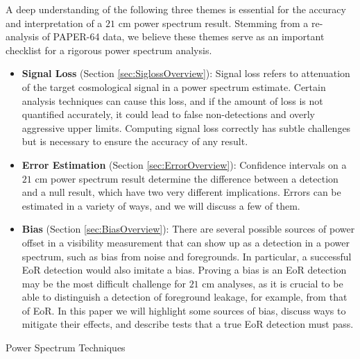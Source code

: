 \documentclass[preprint2,numberedappendix,tighten]{aastex6}  %
\begin{document}
A deep understanding of the following three themes is essential for the accuracy and interpretation of a $21$ cm power 
spectrum result. Stemming from a re-analysis of PAPER-64 data, we believe these themes serve as an important checklist for 
a rigorous power spectrum analysis.
\begin{itemize}
\item \textbf{Signal Loss} (Section \ref{sec:SiglossOverview}): Signal loss refers to attenuation of the target cosmological signal 
in a power spectrum estimate. Certain analysis techniques can cause this loss, and if the amount of loss is not quantified accurately, it could lead to false non-detections and overly aggressive upper limits. Computing signal loss correctly has subtle challenges but is necessary to ensure the accuracy of any result. 
\item \textbf{Error Estimation} (Section \ref{sec:ErrorOverview}): Confidence intervals on a $21$ cm power spectrum result 
determine the difference between a detection and a null result, which have two very different implications. Errors can be 
estimated in a variety of ways, and we will discuss a few of them.
\item \textbf{Bias} (Section \ref{sec:BiasOverview}): There are several possible sources of power offset in a visibility 
measurement that can show up as a detection in a power spectrum, such as bias from noise and foregrounds. In particular, a 
successful EoR detection would also imitate a bias. Proving a bias is an EoR detection may be the most difficult challenge for $21$ cm 
analyses, as it is crucial to be able to distinguish a detection of foreground leakage, for example, from that of EoR. In this paper 
we will highlight some sources of bias, discuss ways to mitigate their effects, and describe tests that a true EoR detection must 
pass.
\end{itemize}

\begin{center}
Power Spectrum Techniques
\end{center}
\end{document}

